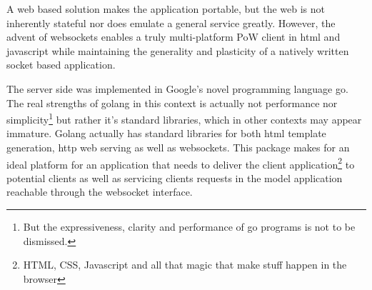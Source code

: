 A web based solution makes the application portable, but the web is not inherently stateful nor does emulate a general service greatly. However, the advent of websockets enables a truly multi-platform PoW client in html and javascript while maintaining the generality and plasticity of a natively written socket based application. 
\begin{comment}
The javascript implementation for handling the protocol is quite simple:
\jscode[firstline=57, firstnumber=57, lastline=84]{../pow.js}
The solution finding part also need to be presented:
\jscode[firstline=26, firstnumber=26, lastline=49]{../pow.js}
To trigger a request to be sent to the server we build the following function which is then registered to the onclick event of a button in the web gui:
\jscode[firstline=100, firstnumber=100, lastline=105]{../pow.js}
\end{comment}

The server side was implemented in Google's novel programming language go\cite{golang}. The real strengths of golang in this context is actually not performance nor simplicity\footnote{But the expressiveness, clarity and performance of go programs is not to be dismissed.} but rather it's standard libraries, which in other contexts may appear immature. Golang actually has standard libraries for both html template generation, http web serving as well as websockets. This package makes for an ideal platform for an application that needs to deliver the client application\footnote{HTML, CSS, Javascript and all that magic that make stuff happen in the browser} to potential clients as well as servicing clients requests in the model application reachable through the websocket interface. 

